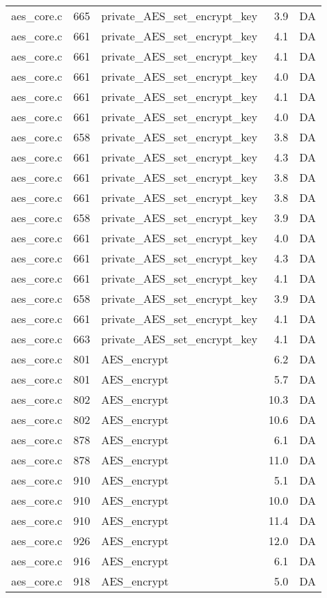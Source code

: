 \begin{table}[h!]
\begin{tabular}{lrlrr}
aes\_core.c& 665&private\_AES\_set\_encrypt\_key&3.9 &DA\\
aes\_core.c& 661&private\_AES\_set\_encrypt\_key&4.1 &DA\\
aes\_core.c& 661&private\_AES\_set\_encrypt\_key&4.1 &DA\\
aes\_core.c& 661&private\_AES\_set\_encrypt\_key&4.0 &DA\\
aes\_core.c& 661&private\_AES\_set\_encrypt\_key&4.1 &DA\\
aes\_core.c& 661&private\_AES\_set\_encrypt\_key&4.0 &DA\\
aes\_core.c& 658&private\_AES\_set\_encrypt\_key&3.8 &DA\\
aes\_core.c& 661&private\_AES\_set\_encrypt\_key&4.3 &DA\\
aes\_core.c& 661&private\_AES\_set\_encrypt\_key&3.8 &DA\\
aes\_core.c& 661&private\_AES\_set\_encrypt\_key&3.8 &DA\\
aes\_core.c& 658&private\_AES\_set\_encrypt\_key&3.9 &DA\\
aes\_core.c& 661&private\_AES\_set\_encrypt\_key&4.0 &DA\\
aes\_core.c& 661&private\_AES\_set\_encrypt\_key&4.3 &DA\\
aes\_core.c& 661&private\_AES\_set\_encrypt\_key&4.1 &DA\\
aes\_core.c& 658&private\_AES\_set\_encrypt\_key&3.9 &DA\\
aes\_core.c& 661&private\_AES\_set\_encrypt\_key&4.1 &DA\\
aes\_core.c& 663&private\_AES\_set\_encrypt\_key&4.1 &DA\\
aes\_core.c& 801&AES\_encrypt&6.2 &DA\\
aes\_core.c& 801&AES\_encrypt&5.7 &DA\\
aes\_core.c& 802&AES\_encrypt&10.3 &DA\\
aes\_core.c& 802&AES\_encrypt&10.6 &DA\\
aes\_core.c& 878&AES\_encrypt&6.1 &DA\\
aes\_core.c& 878&AES\_encrypt&11.0 &DA\\
aes\_core.c& 910&AES\_encrypt&5.1 &DA\\
aes\_core.c& 910&AES\_encrypt&10.0 &DA\\
aes\_core.c& 910&AES\_encrypt&11.4 &DA\\
aes\_core.c& 926&AES\_encrypt&12.0 &DA\\
aes\_core.c& 916&AES\_encrypt&6.1 &DA\\
aes\_core.c& 918&AES\_encrypt&5.0 &DA\\

\end{tabular}
\end{table}
